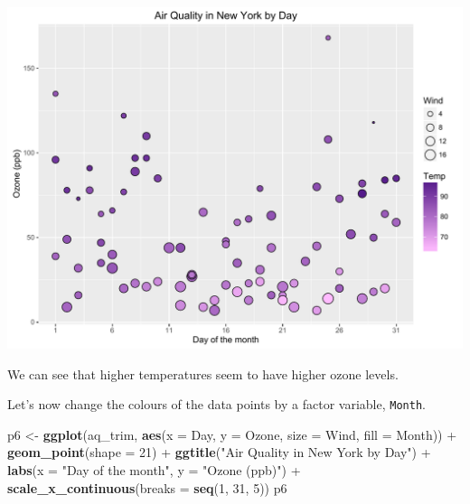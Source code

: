 \documentclass[]{article}
\newenvironment{Shaded}{\begin{snugshade}}{\end{snugshade}}
\newcommand{\KeywordTok}[1]{\textcolor[rgb]{0.13,0.29,0.53}{\textbf{{#1}}}}
\newcommand{\DataTypeTok}[1]{\textcolor[rgb]{0.13,0.29,0.53}{{#1}}}
\newcommand{\DecValTok}[1]{\textcolor[rgb]{0.00,0.00,0.81}{{#1}}}
\newcommand{\StringTok}[1]{\textcolor[rgb]{0.31,0.60,0.02}{{#1}}}
\newcommand{\NormalTok}[1]{{#1}}
\begin{document}
\begin{center}\includegraphics{0_all_posts_pdf/wscatter_9-1} \end{center}

We can see that higher temperatures seem to have higher ozone levels.

Let's now change the colours of the data points by a factor variable,
\texttt{Month}.

\begin{Shaded}
\begin{Highlighting}[]
\NormalTok{p6 <-}\StringTok{ }\KeywordTok{ggplot}\NormalTok{(aq_trim, }\KeywordTok{aes}\NormalTok{(}\DataTypeTok{x =} \NormalTok{Day, }\DataTypeTok{y =} \NormalTok{Ozone, }\DataTypeTok{size =} \NormalTok{Wind, }\DataTypeTok{fill =} \NormalTok{Month)) +}\StringTok{ }
\StringTok{      }\KeywordTok{geom_point}\NormalTok{(}\DataTypeTok{shape =} \DecValTok{21}\NormalTok{) +}
\StringTok{      }\KeywordTok{ggtitle}\NormalTok{(}\StringTok{"Air Quality in New York by Day"}\NormalTok{) +}\StringTok{ }
\StringTok{      }\KeywordTok{labs}\NormalTok{(}\DataTypeTok{x =} \StringTok{"Day of the month"}\NormalTok{, }\DataTypeTok{y =} \StringTok{"Ozone (ppb)"}\NormalTok{) +}
\StringTok{      }\KeywordTok{scale_x_continuous}\NormalTok{(}\DataTypeTok{breaks =} \KeywordTok{seq}\NormalTok{(}\DecValTok{1}\NormalTok{, }\DecValTok{31}\NormalTok{, }\DecValTok{5}\NormalTok{))}
\NormalTok{p6}
\end{Highlighting}
\end{Shaded}
\end{document}

